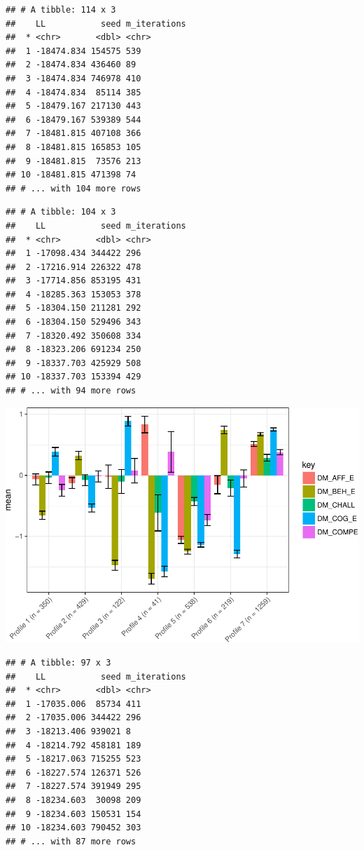 \documentclass[]{book}
\theoremstyle{definition}
\theoremstyle{definition}
\theoremstyle{definition}
\theoremstyle{remark}
\begin{document}
\begin{verbatim}
## # A tibble: 114 x 3
##    LL           seed m_iterations
##  * <chr>       <dbl> <chr>       
##  1 -18474.834 154575 539         
##  2 -18474.834 436460 89          
##  3 -18474.834 746978 410         
##  4 -18474.834  85114 385         
##  5 -18479.167 217130 443         
##  6 -18479.167 539389 544         
##  7 -18481.815 407108 366         
##  8 -18481.815 165853 105         
##  9 -18481.815  73576 213         
## 10 -18481.815 471398 74          
## # ... with 104 more rows
\end{verbatim}

\begin{verbatim}
## # A tibble: 104 x 3
##    LL           seed m_iterations
##  * <chr>       <dbl> <chr>       
##  1 -17098.434 344422 296         
##  2 -17216.914 226322 478         
##  3 -17714.856 853195 431         
##  4 -18285.363 153053 378         
##  5 -18304.150 211281 292         
##  6 -18304.150 529496 343         
##  7 -18320.492 350608 334         
##  8 -18323.206 691234 250         
##  9 -18337.703 425929 508         
## 10 -18337.703 153394 429         
## # ... with 94 more rows
\end{verbatim}

\includegraphics{rosenberg-dissertation_files/figure-latex/spec-solutions-model2-7-1.pdf}

\begin{verbatim}
## # A tibble: 97 x 3
##    LL           seed m_iterations
##  * <chr>       <dbl> <chr>       
##  1 -17035.006  85734 411         
##  2 -17035.006 344422 296         
##  3 -18213.406 939021 8           
##  4 -18214.792 458181 189         
##  5 -18217.063 715255 523         
##  6 -18227.574 126371 526         
##  7 -18227.574 391949 295         
##  8 -18234.603  30098 209         
##  9 -18234.603 150531 154         
## 10 -18234.603 790452 303         
## # ... with 87 more rows
\end{verbatim}
\end{document}
